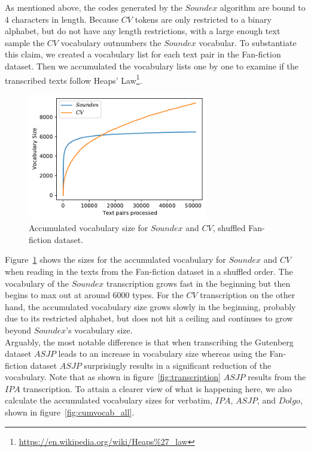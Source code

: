 As mentioned above, the codes generated by the $Soundex$ algorithm are bound to 4 characters in length.
Because $CV$ tokens are only restricted to a binary alphabet, but do not have any length restrictions, with a large enough text sample the $CV$ vocabulary outnumbers the $Soundex$ vocabular.
To substantiate this claim, we created a vocabulary list for each text pair in the Fan-fiction dataset.
Then we accumulated the vocabulary lists one by one to examine if the transcribed texts follow Heaps' Law\footnote{\url{https://en.wikipedia.org/wiki/Heaps\%27_law}}.
\begin{figure}
  \centering
  \includegraphics[width=0.7\textwidth]{figures/cum_vocab_size_ff_shuffled_soundexcv}
  \caption{Accumulated vocabulary size for $Soundex$ and $CV$, shuffled Fan-fiction dataset.}
  \label{fig:cumvocab_soundexcv}
\end{figure}
Figure~\ref{fig:cumvocab_soundexcv} shows the sizes for the accumulated vocabulary for $Soundex$ and $CV$ when reading in the texts from the Fan-fiction dataset in a shuffled order.
The vocabulary of the $Soundex$ transcription grows fast in the beginning but then begins to max out at around 6000 types.
For the $CV$ transcription on the other hand, the accumulated vocabulary size grows slowly in the beginning, probably due to its restricted alphabet, but does not hit a ceiling and continues to grow beyond $Soundex$'s vocabulary size.\\
Arguably, the most notable difference is that when transcribing the Gutenberg dataset $ASJP$ leads to an increase in vocabulary size whereas using the Fan-fiction dataset $ASJP$ surprisingly results in a significant reduction of the vocabulary.
Note that as shown in figure~\ref{fig:transcription} $ASJP$ results from the $IPA$ transcription.
To attain a clearer view of what is happening here, we also calculate the accumulated vocabulary sizes for verbatim, $IPA$, $ASJP$, and $Dolgo$, shown in figure~\ref{fig:cumvocab_all}.
